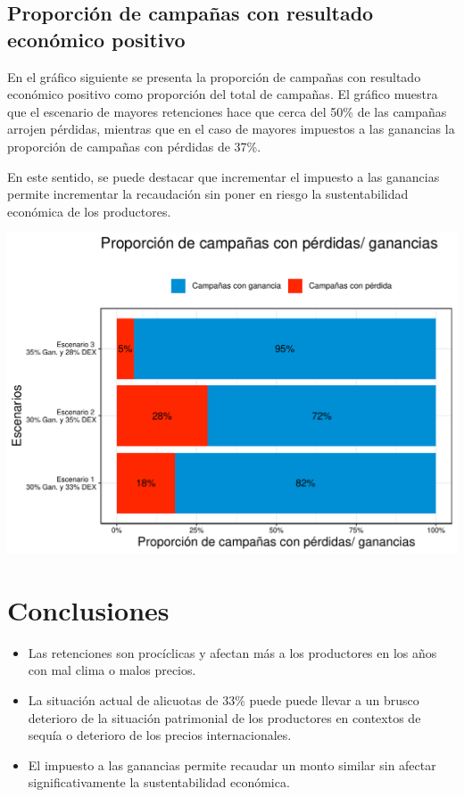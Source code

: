 \documentclass[
  12pt,
  spanish,
  10pt]{article}
\begin{document}
\hypertarget{proporciuxf3n-de-campauxf1as-con-resultado-econuxf3mico-positivo}{%
\subsection{Proporción de campañas con resultado económico
positivo}\label{proporciuxf3n-de-campauxf1as-con-resultado-econuxf3mico-positivo}}

En el gráfico siguiente se presenta la proporción de campañas con
resultado económico positivo como proporción del total de campañas. El
gráfico muestra que el escenario de mayores retenciones hace que cerca
del 50\% de las campañas arrojen pérdidas, mientras que en el caso de
mayores impuestos a las ganancias la proporción de campañas con pérdidas
de 37\%.

En este sentido, se puede destacar que incrementar el impuesto a las
ganancias permite incrementar la recaudación sin poner en riesgo la
sustentabilidad económica de los productores.

\includegraphics{simulacion_retenciones_bagging_files/figure-latex/unnamed-chunk-19-1.pdf}

\hypertarget{conclusiones}{%
\section{Conclusiones}\label{conclusiones}}

\begin{itemize}
\item
  Las retenciones son procíclicas y afectan más a los productores en los
  años con mal clima o malos precios.
\item
  La situación actual de alicuotas de 33\% puede puede llevar a un
  brusco deterioro de la situación patrimonial de los productores en
  contextos de sequía o deterioro de los precios internacionales.
\item
  El impuesto a las ganancias permite recaudar un monto similar sin
  afectar significativamente la sustentabilidad económica.
\end{itemize}
\end{document}
